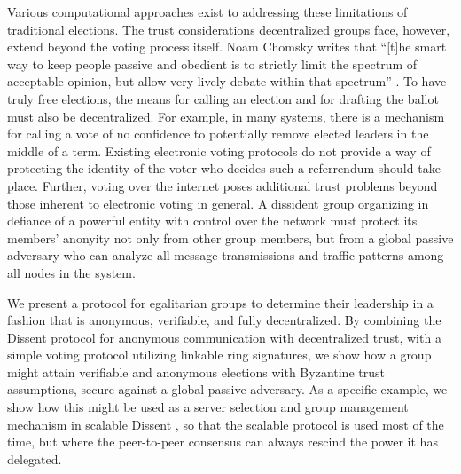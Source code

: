 Various computational approaches exist to addressing these limitations of
traditional elections. The trust considerations decentralized groups face,
however, extend beyond the voting process itself. Noam Chomsky writes that
``[t]he smart way to keep people passive and obedient is to strictly limit the
spectrum of acceptable opinion, but allow very lively debate within that
spectrum'' \cite{chomsky1998common}. To have truly free elections, the means for
calling an election and for drafting the ballot must also be decentralized. For
example, in \tocite many systems, there is a mechanism for calling a vote of no
confidence to potentially remove elected
leaders in the middle of a term. Existing electronic voting protocols do not
provide a way of protecting the identity of the voter who decides such a
referrendum should take place. Further, voting over the internet poses
additional trust problems beyond those inherent to electronic voting in general.
A dissident group organizing in defiance of a powerful entity with control over
the network must protect its members' anonyity not only from other group
members, but from a global passive adversary who can analyze all message
transmissions and traffic patterns among all nodes in the system.

We present a protocol for egalitarian groups to determine their leadership in a
fashion that is anonymous, verifiable, and fully decentralized.  By combining
the Dissent protocol for anonymous communication with decentralized
trust\cite{p2pd}, with a simple voting protocol utilizing linkable ring
signatures\cite{lrs}, we show how a group might attain verifiable and anonymous
elections with Byzantine trust assumptions, secure against a global passive
adversary.  As a specific example, we show how this might be used as a server
selection and group management mechanism in scalable Dissent \cite{din}, so that
the scalable protocol is used most of the time, but where the peer-to-peer
consensus can always rescind the power it has delegated.

%
%
%
%
